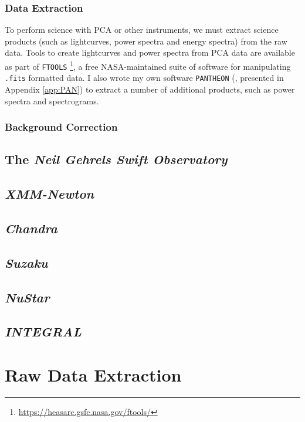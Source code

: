 \subsubsection{Data Extraction}

\par To perform science with PCA or other instruments, we must extract science products (such as lightcurves, power spectra and energy spectra) from the raw data.  Tools to create lightcurves and power spectra from PCA data are available as part of \texttt{FTOOLS} \footnote{\url{https://heasarc.gsfc.nasa.gov/ftools/}}, a free NASA-maintained suite of software for manipulating \texttt{.fits} formatted data.  I also wrote my own software \texttt{PANTHEON} (\citealp{Court_PANTHEON}, presented in Appendix \ref{app:PAN}) to extract a number of additional products, such as power spectra and spectrograms.

\subsubsection{Background Correction}

\subsection{The \textit{Neil Gehrels Swift Observatory}}

\subsection{\textit{XMM-Newton}}

\subsection{\textit{Chandra}}

\subsection{\textit{Suzaku}}

\subsection{\textit{NuStar}}

\subsection{\textit{INTEGRAL}}

\section{Raw Data Extraction}

